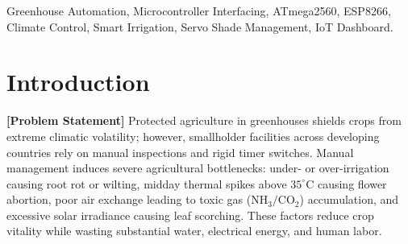 \documentclass[conference]{IEEEtran}
\begin{document}
\maketitle

\begin{abstract}
Traditional greenhouse cultivation requires intensive manual observation, leading to erratic watering, thermal stress, poor air circulation, and solar radiation overexposure that degrade crop yields. In this project, we design and implement an IoT-Based Smart Greenhouse Automation \& Monitoring System combining automated irrigation, climate control, motorized sunlight shade management, and real-time remote telemetry. The localized bare-metal control and multi-sensor acquisition are governed by an Arduino Mega (ATmega2560) master controller, interfacing a DHT22 temperature/humidity sensor, an MQ-135 air-quality/gas probe, a soil moisture sensor, and an LDR light sensor. Actuation is distributed across four closed loops: a 12V DC submersible irrigation pump, a DC evaporative cooling fan, a PWM-driven servo shade motor, and a DC exhaust ventilation fan. Telemetry streaming is offloaded to an ESP8266 Wi-Fi coprocessor via hardware UART, which publishes multi-parameter JSON packets to a real-time web dashboard and cloud database. Experimental benchmarking proves autonomous fail-safe operation ($<120$\,ms actuation latency), non-oscillating hysteresis regulation, a 99.82\% telemetry packet delivery ratio, and seamless manual actuator override capabilities.
\end{abstract}

\begin{IEEEkeywords}
Greenhouse Automation, Microcontroller Interfacing, ATmega2560, ESP8266, Climate Control, Smart Irrigation, Servo Shade Management, IoT Dashboard.
\end{IEEEkeywords}

\section{Introduction}

\noindent \textbf{[Problem Statement]} Protected agriculture in greenhouses shields crops from extreme climatic volatility; however, smallholder facilities across developing countries rely on manual inspections and rigid timer switches. Manual management induces severe agricultural bottlenecks: under- or over-irrigation causing root rot or wilting, midday thermal spikes above $35^\circ\text{C}$ causing flower abortion, poor air exchange leading to toxic gas ($\text{NH}_3/\text{CO}_2$) accumulation, and excessive solar irradiance causing leaf scorching. These factors reduce crop vitality while wasting substantial water, electrical energy, and human labor. 
\end{document}
